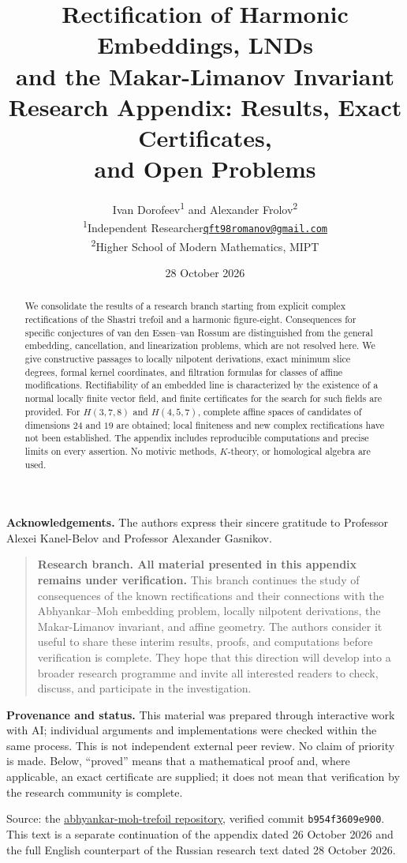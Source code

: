 \documentclass[11pt,a4paper]{article}
\title{\vspace{-12mm}\LARGE\bfseries Rectification of Harmonic Embeddings, LNDs\\and the Makar-Limanov Invariant\\[5pt]\large Research Appendix: Results, Exact Certificates,\\and Open Problems}
\author{Ivan Dorofeev\textsuperscript{1} and Alexander Frolov\textsuperscript{2}\\[3pt]
\normalsize\textsuperscript{1}Independent Researcher\enspace\textperiodcentered\enspace\href{mailto:qft98romanov@gmail.com}{\texttt{qft98romanov@gmail.com}}\\
\normalsize\textsuperscript{2}Higher School of Modern Mathematics, MIPT}
\date{28 October 2026}
\begin{document}
\maketitle\thispagestyle{empty}\vspace{-4mm}
\begin{abstract}
We consolidate the results of a research branch starting from explicit
complex rectifications of the Shastri trefoil and a harmonic figure-eight.
Consequences for specific conjectures of van den Essen--van Rossum are
distinguished from the general embedding, cancellation, and linearization
problems, which are not resolved here. We give constructive passages to
locally nilpotent derivations, exact minimum slice degrees, formal kernel
coordinates, and filtration formulas for classes of affine modifications.
Rectifiability of an embedded line is characterized by the existence of a
normal locally finite vector field, and finite certificates for the search
for such fields are provided. For $H(3,7,8)$ and $H(4,5,7)$, complete affine
spaces of candidates of dimensions $24$ and $19$ are obtained; local
finiteness and new complex rectifications have not been established.
The appendix includes reproducible computations and precise limits on
every assertion. No motivic methods, $K$-theory, or homological algebra
are used.
\end{abstract}
\smallskip
\textbf{Acknowledgements.} The authors express their sincere gratitude to
Professor Alexei Kanel-Belov and Professor Alexander Gasnikov.
\begin{quote}\small
\textbf{Research branch. All material presented in this appendix remains
under verification.} This branch continues the study of consequences of
the known rectifications and their connections with the Abhyankar--Moh
embedding problem, locally nilpotent derivations, the Makar-Limanov
invariant, and affine geometry. The authors consider it useful to share
these interim results, proofs, and computations before verification is
complete. They hope that this direction will develop into a broader
research programme and invite all interested readers to check, discuss,
and participate in the investigation.
\end{quote}
\smallskip
\textbf{Provenance and status.} This material was prepared through
interactive work with AI; individual arguments and implementations were
checked within the same process. This is not independent external peer
review. No claim of priority is made. Below, ``proved'' means that a
mathematical proof and, where applicable, an exact certificate are supplied;
it does not mean that verification by the research community is complete.

Source: the
\href{https://github.com/qft98romanov-hash/abhyankar-moh-trefoil}{abhyankar-moh-trefoil repository},
verified commit \texttt{b954f3609e900}.
This text is a separate continuation of the appendix dated 26 October 2026
and the full English counterpart of the Russian research text dated
28 October 2026.
\newpage\tableofcontents\newpage







\end{document}
